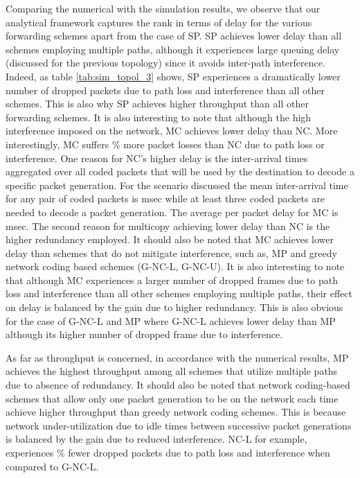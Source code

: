 \documentclass[journal, onecolumn, 12pt]{IEEEtran}
\begin{document}
Comparing the numerical with the simulation results, we observe that our analytical framework captures the rank in terms of delay for the various forwarding schemes apart from the case of SP.
SP achieves lower delay than all schemes employing multiple paths, although it experiences large queuing delay (discussed for the previous topology) since it avoids inter-path interference.
Indeed, as table \ref{tab:sim_topol_3} shows, SP experiences a dramatically lower number of dropped packets due to path loss and interference than all other schemes.
This is also why SP achieves higher throughput than all other forwarding schemes.
It is also interesting to note that although the high interference imposed on the network, MC achieves lower delay than NC.
More interestingly, MC suffers \% more packet losses than NC due to path loss or interference.
One reason for NC's higher delay is the inter-arrival times aggregated over all coded packets that will be used by the destination to decode a specific packet generation.
For the scenario discussed the mean inter-arrival time for any pair of coded packets is msec while at least three coded packets are needed to decode a packet generation.
The average per packet delay for MC is msec.
The second reason for multicopy achieving lower delay than NC is the higher redundancy employed.
It should also be noted that MC achieves lower delay than schemes that do not mitigate interference, such as, MP and greedy network coding based schemes (G-NC-L, G-NC-U).
It is also interesting to note that although MC experiences a larger number of dropped frames due to path loss and interference than all other schemes employing multiple paths,
their effect on delay is balanced by the gain due to higher redundancy.
This is also obvious for the case of G-NC-L and MP where G-NC-L achieves lower delay than MP although its higher number of dropped frame due to interference.

As far as throughput is concerned, in accordance with the numerical results, MP achieves the highest throughput among all schemes that utilize multiple paths due to absence of redundancy.
It should also be noted that network coding-based schemes that allow only one packet generation to be on the network each time achieve higher throughput than greedy network coding schemes.
This is because network under-utilization due to idle times between successive packet generations is balanced by the gain due to reduced interference.
NC-L for example, experiences \% fewer dropped packets due to path loss and interference when compared to G-NC-L.
\end{document}
